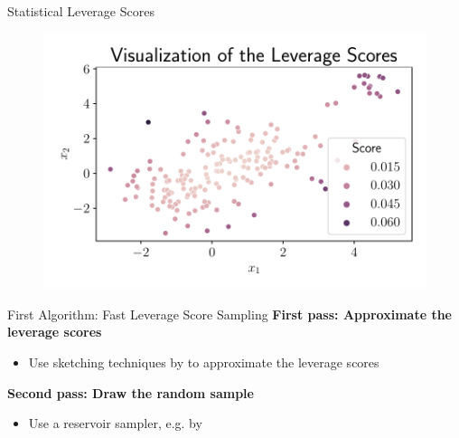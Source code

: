 \documentclass[gray]{beamer}
\begin{document}
\begin{frame}{Statistical Leverage Scores}
    \begin{figure}[ht!]
        \centering
        \includegraphics[width=\linewidth]{../figures/leverage_scores_visualization.pdf}
    \end{figure}
\end{frame}

\begin{frame}{First Algorithm: Fast Leverage Score Sampling}
    \textbf{First pass: Approximate the leverage scores}
    \begin{itemize}
        \item Use sketching techniques by \cite{woodruff-2017} to
              approximate the leverage scores
    \end{itemize}

    \vspace{\fill}

    \textbf{Second pass: Draw the random sample}
    \begin{itemize}
        \item Use a reservoir sampler, e.g. by \cite{reservoir-sampler}
    \end{itemize}

    \vspace{\fill}

    \centering
\end{frame}
\end{document}
